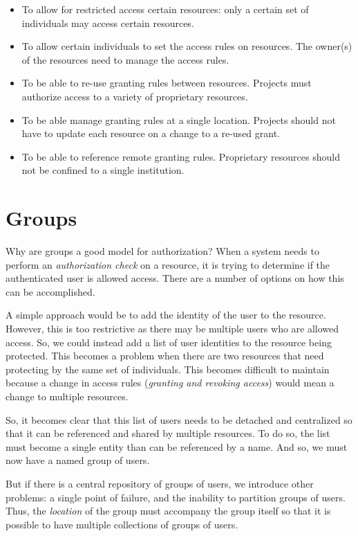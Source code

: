\documentclass[11pt,a4paper]{ivoa}
\begin{document}
\begin{itemize}
\item To allow for restricted access certain resources: only a certain set of individuals may access certain resources.
\item To allow certain individuals to set the access rules on resources.  The owner(s) of the resources need to manage the access rules.
\item To be able to re-use granting rules between resources.  Projects must authorize access to a variety of proprietary resources.
\item To be able manage granting rules at a single location.  Projects should not have to update each resource on a change to a re-used grant.
\item To be able to reference remote granting rules.  Proprietary resources should not be confined to a single institution.
\end{itemize}

\section{Groups}

Why are groups a good model for authorization?  When a system needs to perform an \emph{authorization check} on a resource, it is trying to determine if the authenticated user is allowed access.  There are a number of options on how this can be accomplished.

A simple approach would be to add the identity of the user to the resource.  However, this is too restrictive as there may be multiple users who are allowed access.  So, we could instead add a list of user identities to the resource being protected.  This becomes a problem when there are two resources that need protecting by the same set of individuals.  This becomes difficult to maintain because a change in access rules (\emph{granting and revoking access}) would mean a change to multiple resources.

So, it becomes clear that this list of users needs to be detached and centralized so that it can be referenced and shared by multiple resources.  To do so, the list must become a single entity than can be referenced by a name.  And so, we must now have a named group of users.

But if there is a central repository of groups of users, we introduce other problems:  a single point of failure, and the inability to partition groups of users.  Thus, the \emph{location} of the group must accompany the group itself so that it is possible to have multiple collections of groups of users.
\end{document}
